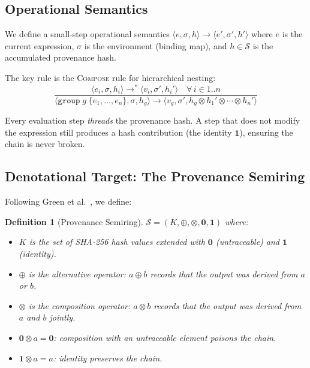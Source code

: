 \documentclass[sigconf,nonacm]{acmart}
\newcommand{\tropplus}{\oplus}
\newcommand{\tropmult}{\otimes}
\newcommand{\provsemiring}{\mathcal{S}}
\newtheorem{definition}{Definition}
\begin{document}
\subsection{Operational Semantics}

We define a small-step operational semantics
$\langle e, \sigma, h \rangle \to \langle e', \sigma', h' \rangle$
where $e$ is the current expression, $\sigma$ is the environment
(binding map), and $h \in \provsemiring$ is the accumulated
provenance hash.

The key rule is the \textsc{Compose} rule for hierarchical
nesting:
$$\frac{\langle e_i, \sigma, h_i \rangle \to^*
  \langle v_i, \sigma', h_i' \rangle \quad \forall\, i \in 1..n}
  {\langle \texttt{group}\;g\;\{e_1, \ldots, e_n\}, \sigma,
  h_g \rangle \to \langle v_g, \sigma',
  h_g \tropmult h_1' \tropmult \cdots \tropmult h_n' \rangle}$$

Every evaluation step \emph{threads} the provenance hash.
A step that does not modify the expression still produces a
hash contribution (the identity $\mathbf{1}$), ensuring the
chain is never broken.

\subsection{Denotational Target: The Provenance Semiring}

Following Green et al.~\cite{green-semiring2007}, we define:

\begin{definition}[Provenance Semiring]
$\provsemiring = (K, \tropplus, \tropmult, \mathbf{0}, \mathbf{1})$
where:
\begin{itemize}
  \item $K$ is the set of SHA-256 hash values extended with
    $\mathbf{0}$ (untraceable) and $\mathbf{1}$ (identity).
  \item $\tropplus$ is the alternative operator: $a \tropplus b$
    records that the output was derived from $a$ \emph{or} $b$.
  \item $\tropmult$ is the composition operator: $a \tropmult b$
    records that the output was derived from $a$ \emph{and} $b$
    jointly.
  \item $\mathbf{0} \tropmult a = \mathbf{0}$: composition with
    an untraceable element poisons the chain.
  \item $\mathbf{1} \tropmult a = a$: identity preserves the chain.
\end{itemize}
\end{definition}
\end{document}
